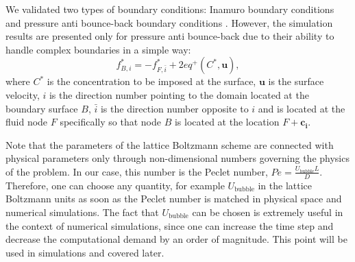 \documentclass{article}
\newcommand{\beq}{\begin{equation}}
\newcommand{\feq}{\end{equation}}
\newcommand{\ububble}{U_{\mathrm{bubble}}}
\newcommand{\cstar}{C^{*}}
\begin{document}

We validated
two types of boundary conditions: Inamuro boundary conditions \cite{inamuro-scalar-boundary} and
pressure anti bounce-back boundary conditions \cite{ginzburg-multireflection}. However, the
simulation results  are presented only for pressure anti bounce-back due to their ability
to handle complex boundaries in a simple way:
\beq
\label{antibb}
f^{*}_{B,i}=-f^{*}_{F,\bar{i}} + 2 eq^+(\cstar,\bm{u}),
\feq
where $\cstar$ is the concentration to be imposed at the surface, $\bm{u}$ is the surface velocity,
$i$ is the direction number pointing to the domain located at the boundary surface $B$,
$\bar{i}$ is the direction number opposite to $i$ and is located at the fluid node $F$ specifically
so that node $B$ is located at the location $F+\bm{c_i}$. 

Note that the parameters of the lattice
Boltzmann scheme are connected with  physical parameters only through  non-dimensional
numbers governing the physics of the problem. In our case, this number is the Peclet number, $Pe=\frac{\ububble L}{D}$.
Therefore, one can choose any quantity, for example 
$\ububble$ in the lattice Boltzmann units as soon as the
Peclet number is  matched in physical space and numerical simulations. The fact that $\ububble$
can be chosen  is extremely useful in the context of numerical simulations, since one can
increase the time step and decrease the computational demand by an order of magnitude. 
This point will be used in simulations and covered later. 
\end{document}
